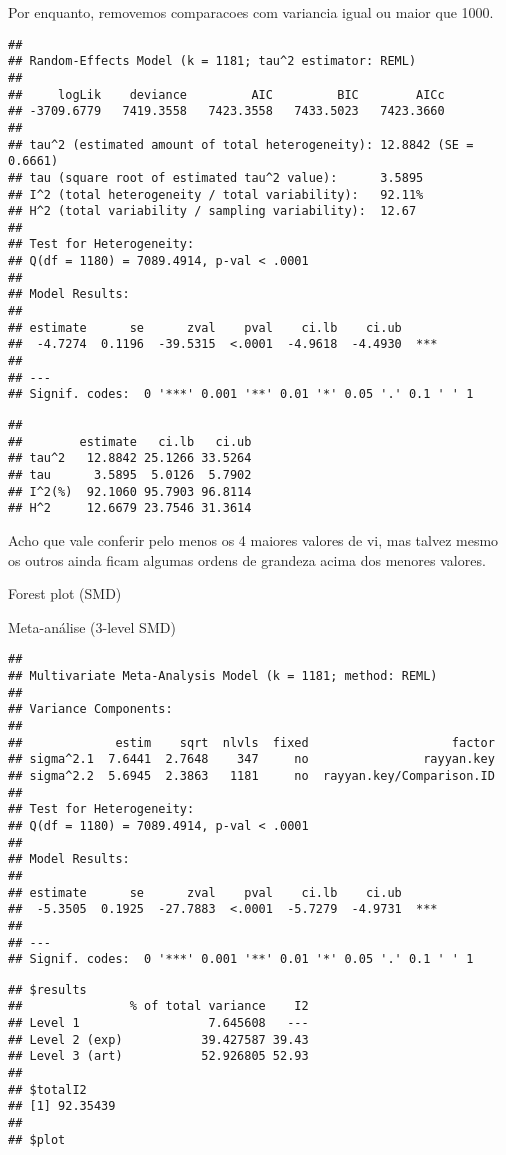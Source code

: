 \documentclass[
]{article}
\begin{document}
Por enquanto, removemos comparacoes com variancia igual ou maior que
1000.

\begin{verbatim}
## 
## Random-Effects Model (k = 1181; tau^2 estimator: REML)
## 
##     logLik    deviance         AIC         BIC        AICc   
## -3709.6779   7419.3558   7423.3558   7433.5023   7423.3660   
## 
## tau^2 (estimated amount of total heterogeneity): 12.8842 (SE = 0.6661)
## tau (square root of estimated tau^2 value):      3.5895
## I^2 (total heterogeneity / total variability):   92.11%
## H^2 (total variability / sampling variability):  12.67
## 
## Test for Heterogeneity:
## Q(df = 1180) = 7089.4914, p-val < .0001
## 
## Model Results:
## 
## estimate      se      zval    pval    ci.lb    ci.ub      
##  -4.7274  0.1196  -39.5315  <.0001  -4.9618  -4.4930  *** 
## 
## ---
## Signif. codes:  0 '***' 0.001 '**' 0.01 '*' 0.05 '.' 0.1 ' ' 1
\end{verbatim}

\begin{verbatim}
## 
##        estimate   ci.lb   ci.ub 
## tau^2   12.8842 25.1266 33.5264 
## tau      3.5895  5.0126  5.7902 
## I^2(%)  92.1060 95.7903 96.8114 
## H^2     12.6679 23.7546 31.3614
\end{verbatim}

Acho que vale conferir pelo menos os 4 maiores valores de vi, mas talvez
mesmo os outros ainda ficam algumas ordens de grandeza acima dos menores
valores.

Forest plot (SMD)

Meta-análise (3-level SMD)

\begin{verbatim}
## 
## Multivariate Meta-Analysis Model (k = 1181; method: REML)
## 
## Variance Components:
## 
##             estim    sqrt  nlvls  fixed                    factor 
## sigma^2.1  7.6441  2.7648    347     no                rayyan.key 
## sigma^2.2  5.6945  2.3863   1181     no  rayyan.key/Comparison.ID 
## 
## Test for Heterogeneity:
## Q(df = 1180) = 7089.4914, p-val < .0001
## 
## Model Results:
## 
## estimate      se      zval    pval    ci.lb    ci.ub      
##  -5.3505  0.1925  -27.7883  <.0001  -5.7279  -4.9731  *** 
## 
## ---
## Signif. codes:  0 '***' 0.001 '**' 0.01 '*' 0.05 '.' 0.1 ' ' 1
\end{verbatim}

\begin{verbatim}
## $results
##               % of total variance    I2
## Level 1                  7.645608   ---
## Level 2 (exp)           39.427587 39.43
## Level 3 (art)           52.926805 52.93
## 
## $totalI2
## [1] 92.35439
## 
## $plot
\end{verbatim}
\end{document}
